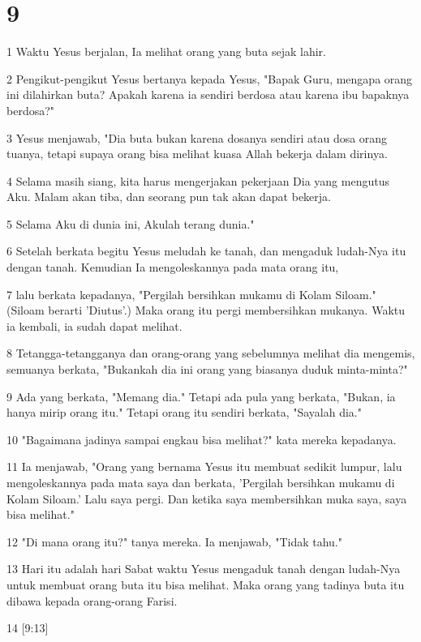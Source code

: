 \chapter{9}

\par 1 Waktu Yesus berjalan, Ia melihat orang yang buta sejak lahir.
\par 2 Pengikut-pengikut Yesus bertanya kepada Yesus, "Bapak Guru, mengapa orang ini dilahirkan buta? Apakah karena ia sendiri berdosa atau karena ibu bapaknya berdosa?"
\par 3 Yesus menjawab, "Dia buta bukan karena dosanya sendiri atau dosa orang tuanya, tetapi supaya orang bisa melihat kuasa Allah bekerja dalam dirinya.
\par 4 Selama masih siang, kita harus mengerjakan pekerjaan Dia yang mengutus Aku. Malam akan tiba, dan seorang pun tak akan dapat bekerja.
\par 5 Selama Aku di dunia ini, Akulah terang dunia."
\par 6 Setelah berkata begitu Yesus meludah ke tanah, dan mengaduk ludah-Nya itu dengan tanah. Kemudian Ia mengoleskannya pada mata orang itu,
\par 7 lalu berkata kepadanya, "Pergilah bersihkan mukamu di Kolam Siloam." (Siloam berarti 'Diutus'.) Maka orang itu pergi membersihkan mukanya. Waktu ia kembali, ia sudah dapat melihat.
\par 8 Tetangga-tetangganya dan orang-orang yang sebelumnya melihat dia mengemis, semuanya berkata, "Bukankah dia ini orang yang biasanya duduk minta-minta?"
\par 9 Ada yang berkata, "Memang dia." Tetapi ada pula yang berkata, "Bukan, ia hanya mirip orang itu." Tetapi orang itu sendiri berkata, "Sayalah dia."
\par 10 "Bagaimana jadinya sampai engkau bisa melihat?" kata mereka kepadanya.
\par 11 Ia menjawab, "Orang yang bernama Yesus itu membuat sedikit lumpur, lalu mengoleskannya pada mata saya dan berkata, 'Pergilah bersihkan mukamu di Kolam Siloam.' Lalu saya pergi. Dan ketika saya membersihkan muka saya, saya bisa melihat."
\par 12 "Di mana orang itu?" tanya mereka. Ia menjawab, "Tidak tahu."
\par 13 Hari itu adalah hari Sabat waktu Yesus mengaduk tanah dengan ludah-Nya untuk membuat orang buta itu bisa melihat. Maka orang yang tadinya buta itu dibawa kepada orang-orang Farisi.
\par 14 [9:13]
